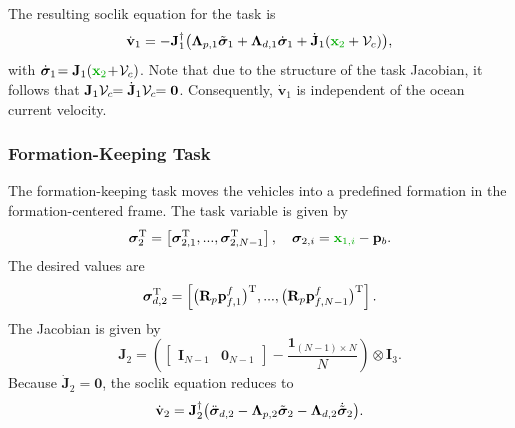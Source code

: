The resulting \gls{soclik} equation for the task is
\begin{equation}
    \dot{\mathbf{v}}_1 = -\mathbf{J}_1^\dagger \bigl( \mathbf{\Lambda}_{p,1}\Tilde{\bm{\sigma}}_1 + \mathbf{\Lambda}_{d,1} \dot{\bm{\sigma}}_1 + \dot{\mathbf{J}}_1 (\dm{\mathbf{x}_2}+\stackedocean)\bigr),
\end{equation}
with $\dot{\bm{\sigma}}_{1\,} \!\!= \mathbf{J}_1 (\dm{\mathbf{x}_2}\! + \!\stackedocean)$. %
Note that due to the structure of the task Jacobian, it follows that $\mathbf{J}_1 \mathcal{V}_c \!\!= \dot{\mathbf{J}}_1 \mathcal{V}_c \!\!= \mathbf{0}$. Consequently, $\dot{\mathbf{v}}_1$ is independent of the ocean current velocity.

\subsubsection{Formation-Keeping Task}
The formation-keeping task moves the vehicles into a predefined formation in the formation-centered frame. The task variable is given by
\begin{equation}
    \bm{\sigma}_2\T = \left[ \bm{\sigma}_{2,1}\T, ..., \bm{\sigma}_{2,N-1}\T\right], \quad \bm{\sigma}_{2,i}  = \dm{\mathbf{x}_{1,i}} - \mathbf{p}_b.
\end{equation}
The desired values are
\begin{equation}
    \bm{\sigma}_{d,2}^{\mathrm{T}} = \left[\bigl(\mathbf{R}_p \mathbf{p}_{f,1}^f\bigr)^{\mathrm{T}}, ..., \bigl(\mathbf{R}_p \mathbf{p}_{f,N-1}^f\bigr)^{\mathrm{T}} \right].
\end{equation}
The Jacobian is given by 
\begin{equation}
    \mathbf{J}_2 = \left(\begin{bmatrix}
        \mathbf{I}_{N-1} & \mathbf{0}_{N-1}
    \end{bmatrix} - \frac{\mathbf{1}_{(N-1) \times N}}{N}\right)\otimes \mathbf{I}_3.
\end{equation}
Because $\dot{\mathbf{J}}_2 = \mathbf{0}$, the \gls{soclik} equation reduces to
\begin{equation}\label{eq:formation_keeping_controller}
    \dot{\mathbf{v}}_2 = \mathbf{J}_2^\dagger \bigl(\ddot{\bm{\sigma}}_{d,2} - \mathbf{\Lambda}_{p,2}\Tilde{\bm{\sigma}}_2 - \mathbf{\Lambda}_{d,2} \dot{\Tilde{\bm{\sigma}}}_2\bigr).
\end{equation}


